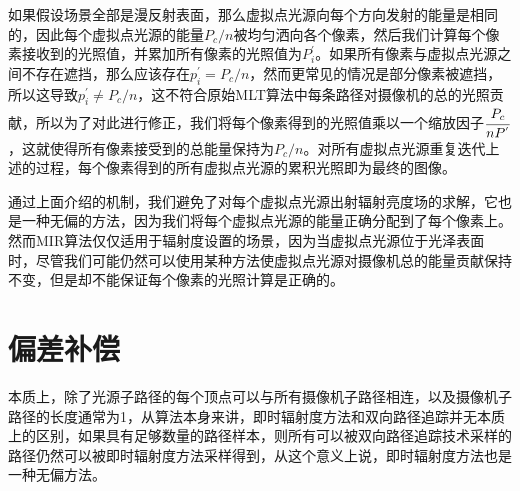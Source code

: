 如果假设场景全部是漫反射表面，那么虚拟点光源向每个方向发射的能量是相同的，因此每个虚拟点光源的能量$P_c/n$被均匀洒向各个像素，然后我们计算每个像素接收到的光照值，并累加所有像素的光照值为$P^{'}_i$。如果所有像素与虚拟点光源之间不存在遮挡，那么应该存在$p^{'}_i=P_c/n$，然而更常见的情况是部分像素被遮挡，所以这导致$p^{'}_i\neq P_c/n$，这不符合原始MLT算法中每条路径对摄像机的总的光照贡献，所以为了对此进行修正，我们将每个像素得到的光照值乘以一个缩放因子$ \cfrac{P_c}{nP^{'}}$，这就使得所有像素接受到的总能量保持为$P_c/n$。对所有虚拟点光源重复迭代上述的过程，每个像素得到的所有虚拟点光源的累积光照即为最终的图像。

通过上面介绍的机制，我们避免了对每个虚拟点光源出射辐射亮度场的求解，它也是一种无偏的方法，因为我们将每个虚拟点光源的能量正确分配到了每个像素上。然而MIR算法仅仅适用于辐射度设置的场景，因为当虚拟点光源位于光泽表面时，尽管我们可能仍然可以使用某种方法使虚拟点光源对摄像机总的能量贡献保持不变，但是却不能保证每个像素的光照计算是正确的。

\section{偏差补偿}\label{sec:bias-compensation}
本质上，除了光源子路径的每个顶点可以与所有摄像机子路径相连，以及摄像机子路径的长度通常为1，从算法本身来讲，即时辐射度方法和双向路径追踪并无本质上的区别，如果具有足够数量的路径样本，则所有可以被双向路径追踪技术采样的路径仍然可以被即时辐射度方法采样得到，从这个意义上说，即时辐射度方法也是一种无偏方法。

